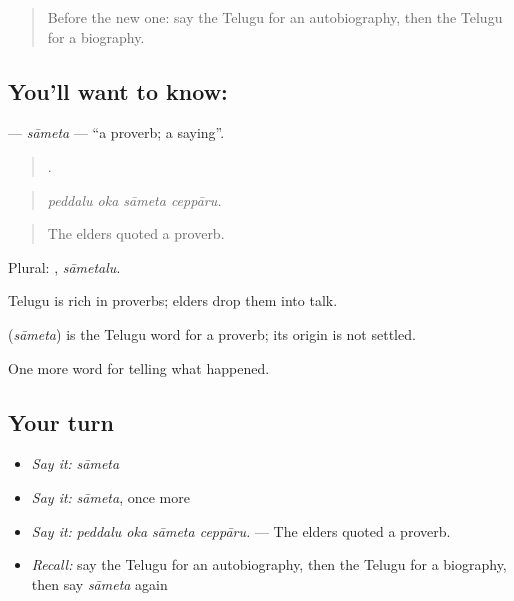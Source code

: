 \label{lesson:TE-C373-sameta}



\begin{quote}
Before the new one: say the Telugu for an autobiography, then the Telugu for a biography.
\end{quote}

\subsection*{You'll want to know: }
\textbf{} — \emph{sāmeta} — \textquotedblleft{}a proverb; a saying\textquotedblright{}.

\begin{quote}
   .
\end{quote}

\begin{quote}
\emph{peddalu oka sāmeta ceppāru.}
\end{quote}

\begin{quote}
The elders quoted a proverb.
\end{quote}

Plural: , \emph{sāmetalu}.

Telugu is rich in proverbs; elders drop them into talk.

\begin{cousinweb}
\textbf{} (\emph{sāmeta}) is the Telugu word for a proverb; its origin is not settled.
\end{cousinweb}

\begin{grammarlens}[title={What you've built}]
One more word for telling what happened.
\end{grammarlens}

\subsection*{Your turn}
\begin{itemize}
\raggedright
  \item \emph{Say it:} \emph{sāmeta}
  \item \emph{Say it:} \emph{sāmeta}, once more
  \item \emph{Say it:} \emph{peddalu oka sāmeta ceppāru.} — The elders quoted a proverb.
  \item \emph{Recall:} say the Telugu for an autobiography, then the Telugu for a biography, then say \emph{sāmeta} again
\end{itemize}

